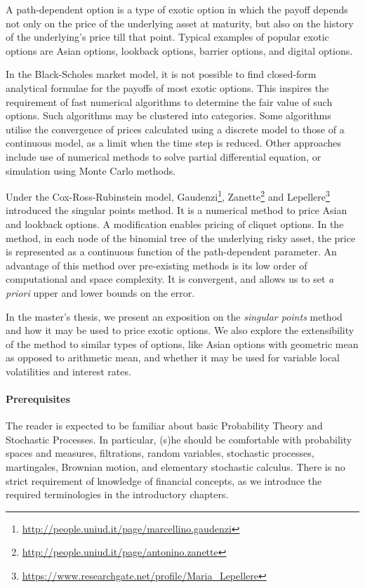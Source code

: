 
A path-dependent option is a type of exotic option in which the payoff depends not only on the price of the underlying asset at maturity, but also on the history of the underlying's price till that point. Typical examples of popular exotic options are Asian options, lookback options, barrier options, and digital options.

In the Black-Scholes market model, it is not possible to find closed-form analytical formulae for the payoffs of most exotic options. This inspires the requirement of fast numerical algorithms to determine the fair value of such options. Such algorithms may be clustered into categories. Some algorithms utilise the convergence of prices calculated using a discrete model to those of a continuous model, as a limit when the time step is reduced. Other approaches include use of numerical methods to solve partial differential equation, or simulation using Monte Carlo methods.

Under the Cox-Ross-Rubinstein model, Gaudenzi\footnote{\url{http://people.uniud.it/page/marcellino.gaudenzi}}, Zanette\footnote{\url{http://people.uniud.it/page/antonino.zanette}} and Lepellere\footnote{\url{https://www.researchgate.net/profile/Maria_Lepellere}} introduced the singular points method. It is a numerical method to price Asian and lookback options. A modification enables pricing of cliquet options. In the method, in each node of the binomial tree of the underlying risky asset, the price is represented as a continuous function of the path-dependent parameter. An advantage of this method over pre-existing methods is its low order of computational and space complexity. It is convergent, and allows us to set \emph{a priori} upper and lower bounds on the error.

In the master's thesis, we present an exposition on the \emph{singular points} method and how it may be used to price exotic options. We also explore the extensibility of the method to similar types of options, like Asian options with geometric mean as opposed to arithmetic mean, and whether it may be used for variable local volatilities and interest rates.


\paragraph{Prerequisites}
The reader is expected to be familiar about basic Probability Theory and Stochastic Processes. In particular, (s)he should be comfortable with probability spaces and measures, filtrations, random variables, stochastic processes, martingales, Brownian motion, and elementary stochastic calculus. There is no strict requirement of knowledge of financial concepts, as we introduce the required terminologies in the introductory chapters.


